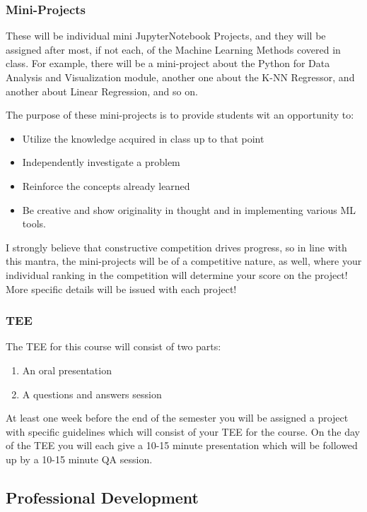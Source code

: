 \documentclass[11pt]{article}
\theoremstyle{plain}
\theoremstyle{definition}
\begin{document}
\subsubsection{Mini-Projects}

These will be individual mini JupyterNotebook Projects, and they will be assigned after most, if not each, of the Machine Learning Methods covered in class. For example, there will be a mini-project about the Python for Data Analysis and Visualization module, another one about the K-NN Regressor, and another about Linear Regression, and so on. 

\vskip 8pt

The purpose of these mini-projects is to provide students wit an opportunity to:

\begin{itemize}
\item Utilize the knowledge acquired in class up to that point
\item  Independently investigate a problem
\item Reinforce the concepts already learned
\item Be creative and show originality in thought and in implementing various ML tools.
\end{itemize}

I strongly believe that constructive competition drives progress, so in line with this mantra, the mini-projects will be of a competitive nature, as well, where your individual ranking in the competition will determine your score on the project! More specific details will be issued with each project! 

\subsubsection{TEE}

The TEE for this course will consist of two parts:
\begin{enumerate}[1)]
\item An oral presentation
\item A questions and answers session
\end{enumerate}

At least one week before the end of the semester you will be assigned a project with specific guidelines which will consist of your TEE for the course. On the day of the TEE  you will each give a 10-15 minute presentation which will be followed up by a 10-15 minute QA session. 

\subsection{Professional Development}
\end{document}
